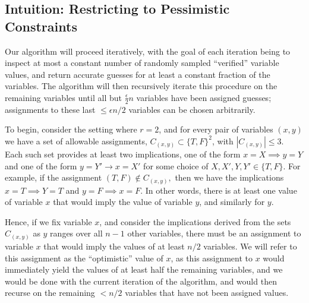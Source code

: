 \documentclass[final,12pt]{colt2018}
\newcommand{\eps}{\epsilon}
\begin{document}




\subsection{Intuition: Restricting to Pessimistic Constraints}\label{sec:intuitP2}


Our algorithm will proceed iteratively, with the goal of each iteration being to inspect at most a constant number of randomly sampled ``verified'' variable values, and return accurate guesses for at least a constant fraction of the variables.  The algorithm will then recursively iterate this procedure on the remaining variables until all but $\frac{\eps}{2}n$ variables have been assigned guesses; assignments to these last $\le \eps n/2$ variables can be chosen arbitrarily.

To begin, consider the setting where $r=2$, and for every pair of variables $(x,y)$ we have a set of allowable assignments, $C_{(x,y)} \subset \{T,F\}^2$, with $|C_{(x,y)}| \le 3.$    Each such set provides at least two implications, one of the form $x = X \implies y = Y$ and one of the form $y=Y' \rightarrow x = X'$ for some choice of  $X,X',Y,Y' \in \{T,F\}$.  For example, if the assignment $(T,F) \not \in C_{(x,y)},$ then we have the implications $x = T \implies Y = T$ and $y=F \implies x = F$.   In other words, there is at least one value of variable $x$ that would imply the value of variable $y$, and similarly for $y$.  

Hence, if we fix variable $x$, and consider the implications derived from the sets $C_{(x,y)}$ as $y$ ranges over all $n-1$ other variables, there must be an assignment to variable $x$ that would imply the values of at least $n/2$ variables.  We will refer to this assignment as the ``optimistic'' value of $x$, as this assignment to $x$ would immediately yield the values of at least half the remaining variables, and we would be done with the current iteration of the algorithm, and would then recurse on the remaining $< n/2$ variables that have not been assigned values.
\end{document}
